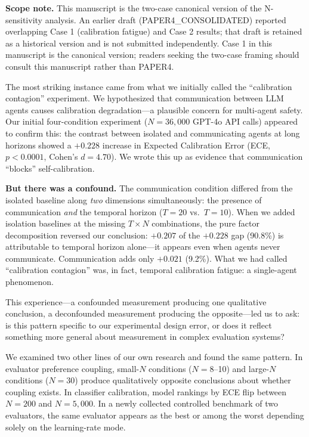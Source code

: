 \documentclass[11pt]{article}
\begin{document}
\textbf{Scope note.} This manuscript is the two-case canonical version of the N-sensitivity analysis. An earlier draft (PAPER4\_CONSOLIDATED) reported overlapping Case 1 (calibration fatigue) and Case 2 results; that draft is retained as a historical version and is not submitted independently. Case 1 in this manuscript is the canonical version; readers seeking the two-case framing should consult this manuscript rather than PAPER4.

The most striking instance came from what we initially called the ``calibration contagion'' experiment. We hypothesized that communication between LLM agents causes calibration degradation---a plausible concern for multi-agent safety. Our initial four-condition experiment ($N{=}36{,}000$ GPT-4o API calls) appeared to confirm this: the contrast between isolated and communicating agents at long horizons showed a $+0.228$ increase in Expected Calibration Error (ECE, $p < 0.0001$, Cohen's $d = 4.70$). We wrote this up as evidence that communication ``blocks'' self-calibration.

\textbf{But there was a confound.} The communication condition differed from the isolated baseline along \emph{two} dimensions simultaneously: the presence of communication \emph{and} the temporal horizon ($T{=}20$ vs.\ $T{=}10$). When we added isolation baselines at the missing $T{\times}N$ combinations, the pure factor decomposition reversed our conclusion: $+0.207$ of the $+0.228$ gap (90.8\%) is attributable to temporal horizon alone---it appears even when agents never communicate. Communication adds only $+0.021$ (9.2\%). What we had called ``calibration contagion'' was, in fact, temporal calibration fatigue: a single-agent phenomenon.

This experience---a confounded measurement producing one qualitative conclusion, a deconfounded measurement producing the opposite---led us to ask: is this pattern specific to our experimental design error, or does it reflect something more general about measurement in complex evaluation systems?

We examined two other lines of our own research and found the same pattern. In evaluator preference coupling, small-$N$ conditions ($N{=}8$--10) and large-$N$ conditions ($N{=}30$) produce qualitatively opposite conclusions about whether coupling exists. In classifier calibration, model rankings by ECE flip between $N{=}200$ and $N{=}5{,}000$. In a newly collected controlled benchmark of two evaluators, the same evaluator appears as the best or among the worst depending solely on the learning-rate mode.
\end{document}

